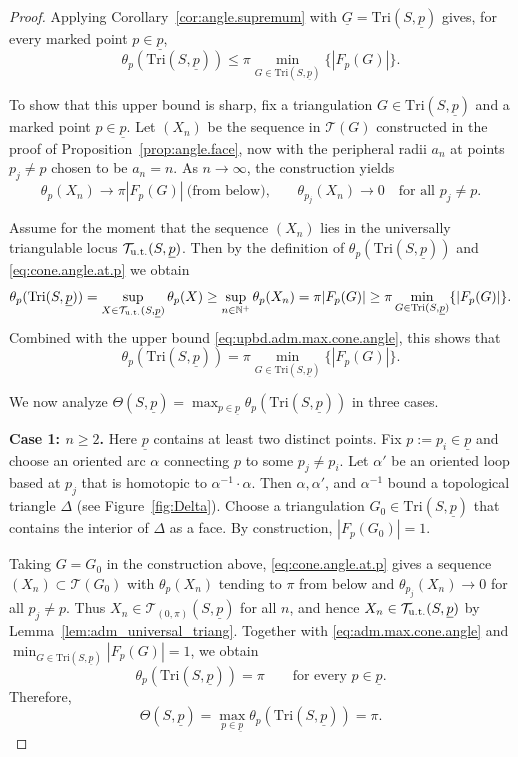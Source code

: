 \documentclass[11pt, letterpaper]{amsart}
\theoremstyle{definition}
\theoremstyle{remark}
\newcommand{\up}{\underline{p}}
\newcommand{\Sp}{(S,\up)}
\newcommand{\TSp}{\text{Tri}\Sp}
\newcommand{\cT}{\mathcal{T}}
\newcommand{\bN}{\mathbb{N}}
\numberwithin{equation}{section}
\begin{document}
\begin{proof}
Applying Corollary~\ref{cor:angle.supremum} with \(\underline{G} = \TSp\) gives, for every marked point \(p \in \up\),
\begin{equation}\label{eq:upbd.adm.max.cone.angle}
\theta_p(\TSp)\leq \pi\min_{G\in\TSp}\{|F_p(G)|\}.
\end{equation}

To show that this upper bound is sharp, fix a triangulation \(G\in\TSp\) and a marked point \(p\in\up\).
Let \((X_n)\) be the sequence in \(\cT(G)\) constructed in the proof of Proposition~\ref{prop:angle.face}, now with the peripheral radii \(a_n\) at points \(p_j\neq p\) chosen to be \(a_n = n\).
As \(n\to\infty\), the construction yields
\begin{equation}\label{eq:cone.angle.at.p}
\theta_p(X_n)\rightarrow\pi|F_p(G)|~\text{(from below),}
\qquad 
\theta_{p_j}(X_n)\rightarrow 0
\quad\text{for all } p_j\neq p.
\end{equation}

Assume for the moment that the sequence \((X_n)\) lies in the universally triangulable locus \(\cT_{\rm u.t.}\Sp\).
Then by the definition of \(\theta_p(\TSp)\) and \eqref{eq:cone.angle.at.p} we obtain
\[
\theta_p(\TSp)
=\sup_{X\in\cT_{\rm u.t.}\Sp}\theta_p(X)
\geq \sup_{n\in\bN^+}\theta_p(X_n)
=\pi|F_p(G)|
\geq\pi\min_{G\in\TSp}\{|F_p(G)|\}.
\]
Combined with the upper bound \eqref{eq:upbd.adm.max.cone.angle}, this shows that
\begin{equation}\label{eq:adm.max.cone.angle}
\theta_p(\TSp)
=\pi\min_{G\in\TSp}\{|F_p(G)|\}.
\end{equation}

We now analyze \(\Theta\Sp = \max_{p\in\up}\theta_p(\TSp)\) in three cases.

\medskip\noindent\textbf{Case 1: \(n\geq 2\).}
Here \(\up\) contains at least two distinct points.
Fix \(p:=p_i\in\up\) and choose an oriented arc \(\alpha\) connecting \(p\) to some \(p_j\neq p_i\).
Let \(\alpha'\) be an oriented loop based at \(p_j\) that is homotopic to \(\alpha^{-1}\cdot\alpha\).
Then \(\alpha,\alpha'\), and \(\alpha^{-1}\) bound a topological triangle \(\Delta\) (see Figure~\ref{fig:Delta}).
Choose a triangulation \(G_0\in\TSp\) that contains the interior of \(\Delta\) as a face.
By construction, \(|F_p(G_0)|=1\).

Taking \(G=G_0\) in the construction above, \eqref{eq:cone.angle.at.p} gives a sequence \((X_n)\subset\cT(G_0)\) with
\(\theta_p(X_n)\) tending to \(\pi\) from below and \(\theta_{p_j}(X_n)\to0\) for all \(p_j\neq p\).
Thus \(X_n\in\cT_{(0,\pi)}(S,\up)\) for all \(n\), and hence \(X_n\in\cT_{\rm u.t.}\Sp\) by Lemma~\ref{lem:adm_universal_triang}.
Together with \eqref{eq:adm.max.cone.angle} and \(\min_{G\in\TSp}|F_p(G)| = 1\), we obtain
\[
\theta_p(\TSp)=\pi
\qquad\text{for every }p\in\up.
\]
Therefore,
\[
\Theta\Sp
=\max_{p\in\up}\theta_p(\TSp)
=\pi.
\]


\end{proof}
\end{document}
